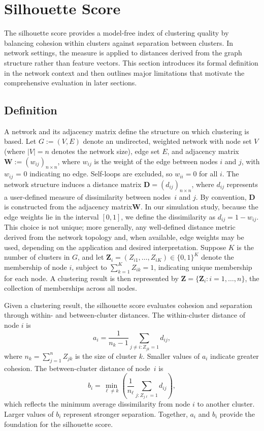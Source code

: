 \documentclass[12pt, titlepage, reqno]{article}
\begin{document}
\section{Silhouette Score}
\label{sec:silhouette}


The silhouette score provides a model-free index of clustering
quality by balancing cohesion within clusters against separation
between clusters. In network settings, the measure is applied to
distances derived from the graph structure rather than feature
vectors. This section introduces its formal definition in the
network context and then outlines major limitations that motivate
the comprehensive evaluation in later sections.


\subsection{Definition}


A network and its adjacency matrix define the structure on which
clustering is based. Let $G := (V, E)$ denote an undirected,
weighted network with node set $V$ (where $|V| = n$ denotes the 
network size), edge set $E$, and adjacency matrix $\bm{W} := 
(w_{ij})_{n \times n}$, where $w_{ij}$ is the weight of the 
edge between nodes $i$ and $j$, with $w_{ij}$ = 0 indicating no 
edge. Self-loops are excluded, so $w_{ii} = 0$ for all $i$. The 
network structure induces a distance matrix $\bm{D} = (d_{ij})_{n 
\times n}$, where $d_{ij}$ represents a user-defined measure of 
dissimilarity between nodes~$i$ and $j$. By convention, $\bm{D}$ is 
constructed from the adjacency matrix$\bm{W}$. In our simulation 
study, because the edge weights lie in the interval $[0,1]$, we 
define the dissimilarity as $d_{ij} = 1 - w_{ij}$. This choice is not 
unique; more generally, any well-defined distance metric derived from 
the network topology and, when available, edge weights may be used, 
depending on the application and desired interpretation. Suppose $K$ 
is the number
of clusters in $G$, and let
$\bm{Z}_i = (Z_{i1}, \ldots, Z_{iK}) \in \{0,1\}^K$
denote the membership of node $i$, subject to
$\sum_{k=1}^K Z_{ik} = 1$, indicating unique membership for each 
node. A clustering result is then represented
by $\bm{Z} = \{\bm{Z}_i : i = 1, \ldots, n\}$, the collection of
memberships across all nodes.


Given a clustering result, the silhouette score evaluates cohesion 
and separation through within- and between-cluster distances. The
within-cluster distance of node $i$ is
\begin{equation}
  \label{eq:sil_a}
  a_i = \frac{1}{n_k - 1} \sum_{j \ne i: Z_{jk} = 1} d_{ij},
\end{equation}
where $n_k = \sum_{j=1}^n Z_{jk}$ is the size of cluster $k$. Smaller 
values of $a_i$ indicate greater 
cohesion. The between-cluster distance of node~$i$ is
\begin{equation}
  \label{eq:sil_b}
  b_i = \min_{\ell \neq k}\left(\frac{1}{n_\ell}
  \sum_{j: Z_{j\ell} = 1} d_{ij}\right),
\end{equation}
which reflects the minimum average dissimilarity from node $i$ to
another cluster. Larger values of $b_i$ represent stronger
separation. Together, $a_i$ and $b_i$ provide the foundation for the
silhouette score.
\end{document}
